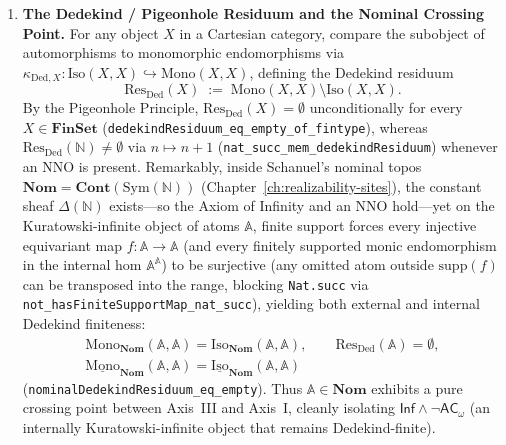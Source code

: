 \documentclass[10pt,twoside,openright]{book}
\theoremstyle{crmplain}
\theoremstyle{crmdef}
\theoremstyle{crmremark}
\begin{document}
\begin{enumerate}[label=\textbf{\arabic*.},leftmargin=1.8em]
  \item \textbf{The Dedekind / Pigeonhole Residuum and the Nominal Crossing Point.} For any object $X$ in a Cartesian category, compare the subobject of automorphisms to monomorphic endomorphisms via $\kappa_{\mathrm{Ded}, X} : \mathrm{Iso}(X, X) \hookrightarrow \mathrm{Mono}(X, X)$, defining the Dedekind residuum
  \[
    \mathrm{Res}_{\mathrm{Ded}}(X) \;:=\; \mathrm{Mono}(X, X) \setminus \mathrm{Iso}(X, X).
  \]
  By the Pigeonhole Principle, $\mathrm{Res}_{\mathrm{Ded}}(X) = \emptyset$ unconditionally for every $X \in \mathbf{FinSet}$ (\texttt{dedekindResiduum\_\allowbreak eq\_\allowbreak empty\_\allowbreak of\_\allowbreak fintype}), whereas $\mathrm{Res}_{\mathrm{Ded}}(\mathbb{N}) \neq \emptyset$ via $n \mapsto n + 1$ (\texttt{nat\_\allowbreak succ\_\allowbreak mem\_\allowbreak dedekindResiduum}) whenever an $\mathrm{NNO}$ is present. Remarkably, inside Schanuel's nominal topos $\mathbf{Nom} = \mathbf{Cont}(\mathrm{Sym}(\mathbb{N}))$ (Chapter~\ref{ch:realizability-sites}), the constant sheaf $\Delta(\mathbb{N})$ exists---so the Axiom of Infinity and an $\mathrm{NNO}$ hold---yet on the Kuratowski-infinite object of atoms $\mathbb{A}$, finite support forces every injective equivariant map $f : \mathbb{A} \to \mathbb{A}$ (and every finitely supported monic endomorphism in the internal hom $\mathbb{A}^{\mathbb{A}}$) to be surjective (any omitted atom outside $\mathrm{supp}(f)$ can be transposed into the range, blocking \texttt{Nat.succ} via \texttt{not\_\allowbreak hasFiniteSupportMap\_\allowbreak nat\_\allowbreak succ}), yielding both external and internal Dedekind finiteness:
  \[
    \begin{gathered}
      \mathrm{Mono}_{\mathbf{Nom}}(\mathbb{A}, \mathbb{A}) = \mathrm{Iso}_{\mathbf{Nom}}(\mathbb{A}, \mathbb{A}), \qquad
      \mathrm{Res}_{\mathrm{Ded}}(\mathbb{A}) = \emptyset, \\
      \underline{\mathrm{Mono}}_{\mathbf{Nom}}(\mathbb{A}, \mathbb{A}) = \underline{\mathrm{Iso}}_{\mathbf{Nom}}(\mathbb{A}, \mathbb{A})
    \end{gathered}
  \]
  (\texttt{nominalDedekindResiduum\_\allowbreak eq\_\allowbreak empty}). Thus $\mathbb{A} \in \mathbf{Nom}$ exhibits a pure crossing point between Axis~III and Axis~I, cleanly isolating $\mathsf{Inf} \wedge \neg\mathsf{AC}_\omega$ (an internally Kuratowski-infinite object that remains Dedekind-finite).


\end{enumerate}
\end{document}
